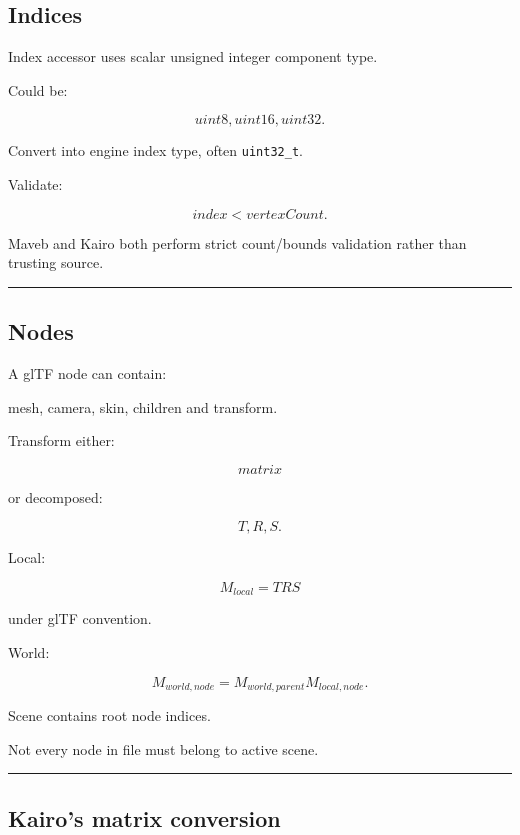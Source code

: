 \subsection{Indices}\label{04-visual-computing-ii-ch041-indices}

Index accessor uses scalar unsigned integer component type.

Could be:

\[
uint8,uint16,uint32.
\]

Convert into engine index type, often \texttt{uint32\_t}.

Validate:

\[
index<vertexCount.
\]

Maveb and Kairo both perform strict count/bounds validation rather than trusting source.

\begin{center}\rule{0.5\linewidth}{0.5pt}\end{center}

\subsection{Nodes}\label{04-visual-computing-ii-ch041-nodes}

A glTF node can contain:

mesh, camera, skin, children and transform.

Transform either:

\[
matrix
\]

or decomposed:

\[
T,R,S.
\]

Local:

\[
M_{local}
=
T
R
S
\]

under glTF convention.

World:

\[
\boxed{
M_{world,node}
=
M_{world,parent}
M_{local,node}.
}
\]

Scene contains root node indices.

Not every node in file must belong to active scene.

\begin{center}\rule{0.5\linewidth}{0.5pt}\end{center}

\subsection{Kairo's matrix conversion}\label{04-visual-computing-ii-ch041-kairos-matrix-conversion}

